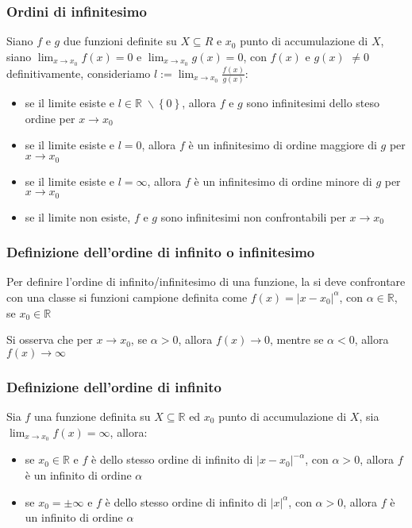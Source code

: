\documentclass[a4paper]{article}
\begin{document}
\subsubsection*{Ordini di infinitesimo}
Siano \(f\) e \(g\) due funzioni definite su \(X \subseteq R\) e \(x_0\) punto di accumulazione di \(X\), siano \(\displaystyle \lim_{x \to x_0} f(x) = 0\)
e \(\displaystyle \lim_{x \to x_0} g(x) = 0\), con \(f(x)\) e \(g(x)\) \(\neq 0\) definitivamente, consideriamo \(\displaystyle l := \lim_{x \to x_0} \frac{f(x)}{g(x)}\):
\begin{itemize}
	\item se il limite esiste e \(l \in \mathbb{R} \; \backslash \left\{0\right\}\), allora \(f\) e \(g\) sono infinitesimi dello steso ordine per \(x \to x_0\)
	\item se il limite esiste e \(l = 0\), allora \(f\) è un infinitesimo di ordine maggiore di \(g\) per \(x \to x_0\)
	\item se il limite esiste e \(l = \infty\), allora \(f\) è un infinitesimo di ordine minore di \(g\) per \(x \to x_0\)
	\item se il limite non esiste, \(f\) e \(g\) sono infinitesimi non confrontabili per \(x \to x_0\)
\end{itemize}

\subsubsection*{Definizione dell'ordine di infinito o infinitesimo}
Per definire l'ordine di infinito/infinitesimo di una funzione, la si deve confrontare con una classe si funzioni campione definita
come \(f(x) = \left| x - x_0 \right| ^ \alpha\), con \(\alpha \in \mathbb{R}\), se \(x_0 \in \mathbb{R}\)

Si osserva che per \(x \to x_0\), se \(\alpha > 0\), allora \(f(x) \to 0\), mentre se \(\alpha < 0\), allora \(f(x) \to \infty\)

\subsubsection*{Definizione dell'ordine di infinito}
Sia \(f\) una funzione definita su \(X \subseteq \mathbb{R}\) ed \(x_0\) punto di accumulazione di \(X\), sia \(\displaystyle \lim_{x \to x_0} f(x) = \infty\), allora:
\begin{itemize}
	\item se \(x_0 \in \mathbb{R}\) e \(f\) è dello stesso ordine di infinito di \(\left| x - x_0 \right| ^ {-\alpha}\), con \(\alpha > 0\),
	allora \(f\) è un infinito di ordine \(\alpha\)
	\item se \(x_0 = \pm \infty\) e \(f\) è dello stesso ordine di infinito di \(\left| x \right| ^ \alpha\), con \(\alpha > 0\),
	allora \(f\) è un infinito di ordine \(\alpha\)
\end{itemize}
\end{document}
